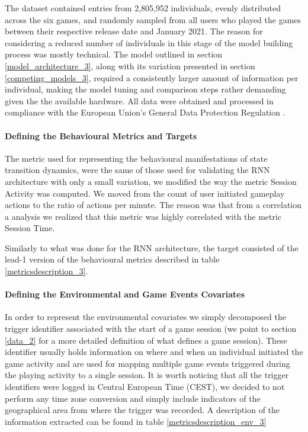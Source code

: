 The dataset contained entries from 2,805,952 individuals, evenly distributed across the six games, and randomly sampled from all users who played the games between their respective release date and January 2021. The reason for considering a reduced number of individuals in this stage of the model building process was mostly technical. The model outlined in section \ref{model_architecture_3}, along with its variation presented in section \ref{competing_models_3}, required a consistently larger amount of information per individual, making the model tuning and comparison steps rather demanding given the the available hardware. All data were obtained and processed in compliance with the European Union's General Data Protection Regulation \cite{EUdataregulations2018}. 

\paragraph*{Defining the Behavioural Metrics and Targets}
The metric used for representing the behavioural manifestations of state transition dynamics, were the same 
of those used for validating the RNN architecture with only a small variation,  we modified the way the metric Session Activity was computed. We moved from the count of user initiated gameplay actions to the ratio of actions per minute. The reason was that from a correlation a analysis we realized that this metric was highly correlated with the metric Session Time.

Similarly to what was done for the RNN architecture, the target consisted of the lead-1 version of the behavioural metrics described in table \ref{metricsdescription_3}.

\paragraph*{Defining the Environmental and Game Events Covariates}
In order to represent the environmental covariates we simply decomposed the trigger identifier associated with the start of a game session (we point to section \ref{data_2} for a more detailed definition of what defines a game session). These identifier usually holds information on where and when an individual initiated the game activity and are used for mapping multiple game events triggered during the playing activity to a single session. It is worth noticing that all the trigger identifiers were logged in Central European Time (CEST), we decided to not perform any time zone conversion and simply include indicators of the geographical area from where the trigger was recorded. A description of the information extracted can be found in table \ref{metricsdescription_env_3}

